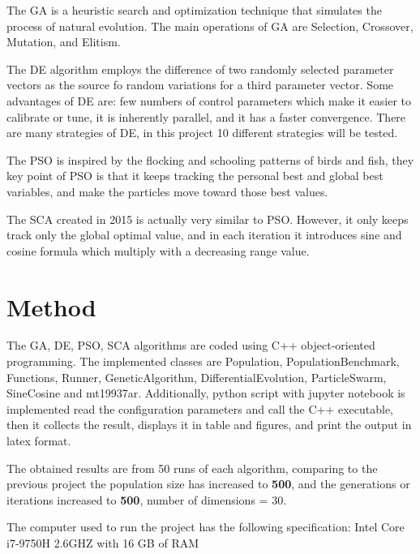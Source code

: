 \documentclass[12pt]{article}
\begin{document}
    The GA is a heuristic search and optimization technique that simulates the process of natural evolution. The main operations of GA are Selection, Crossover, Mutation, and Elitism.
    
    The DE algorithm employs the difference of two randomly selected parameter vectors as the source fo random variations for a third parameter vector. Some advantages of DE are: few numbers of control parameters which make it easier to calibrate or tune, it is inherently parallel, and it has a faster convergence. 
    There are many strategies of DE, in this project 10 different strategies will be tested.
    
    
    The PSO is inspired by the flocking and schooling patterns of birds and fish, they key point of PSO is that it keeps tracking the personal best and global best variables, and make the particles move toward those best values.
    
    The SCA created in 2015 is actually very similar to PSO. However, it only keeps track only the global optimal value, and in each iteration it introduces sine and cosine formula which multiply with a decreasing range value.
     


    
    \section{Method}
    
    The GA, DE, PSO, SCA algorithms are coded using C++ object-oriented programming. The implemented classes are Population, PopulationBenchmark,  Functions, Runner, GeneticAlgorithm, DifferentialEvolution, ParticleSwarm, SineCosine and mt19937ar. Additionally,
    python script with jupyter notebook is implemented read the configuration parameters and call the C++ executable, then it collects the result, displays it in table and figures, and print the output in latex format.
    
    The obtained results are from 50 runs of each algorithm, comparing to the previous project the population size has increased to \textbf{500}, and the generations or iterations increased to \textbf{500}, number of dimensions = 30.

The computer used to run the project has the following specification: Intel Core i7-9750H 2.6GHZ with 16 GB of RAM

  
      
    
\end{document}

